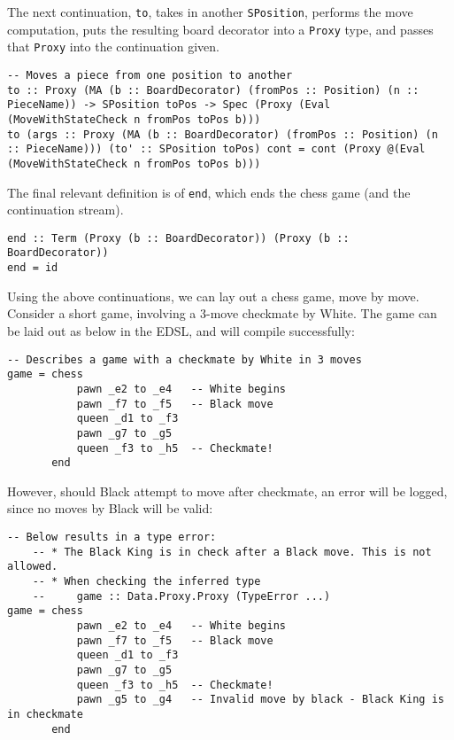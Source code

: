 \documentclass[12pt, a4paper]{scrartcl}
\begin{document}
The next continuation, \lstinline{to}, takes in another \lstinline{SPosition}, performs the move computation, puts the resulting board decorator into a \lstinline{Proxy} type, and passes that \lstinline{Proxy} into the continuation given.

\begin{lstlisting}
-- Moves a piece from one position to another
to :: Proxy (MA (b :: BoardDecorator) (fromPos :: Position) (n :: PieceName)) -> SPosition toPos -> Spec (Proxy (Eval (MoveWithStateCheck n fromPos toPos b)))
to (args :: Proxy (MA (b :: BoardDecorator) (fromPos :: Position) (n :: PieceName))) (to' :: SPosition toPos) cont = cont (Proxy @(Eval (MoveWithStateCheck n fromPos toPos b)))
\end{lstlisting}

The final relevant definition is of \lstinline{end}, which ends the chess game (and the continuation stream).

\begin{lstlisting}
end :: Term (Proxy (b :: BoardDecorator)) (Proxy (b :: BoardDecorator))
end = id
\end{lstlisting}

Using the above continuations, we can lay out a chess game, move by move. Consider a short game, involving a 3-move checkmate by White. The game can be laid out as below in the EDSL, and will compile successfully:

\begin{lstlisting}
-- Describes a game with a checkmate by White in 3 moves
game = chess
           pawn _e2 to _e4   -- White begins
           pawn _f7 to _f5   -- Black move
           queen _d1 to _f3
           pawn _g7 to _g5
           queen _f3 to _h5  -- Checkmate!
       end
\end{lstlisting}

However, should Black attempt to move after checkmate, an error will be logged, since no moves by Black will be valid:

\begin{lstlisting}
-- Below results in a type error:
    -- * The Black King is in check after a Black move. This is not allowed.
    -- * When checking the inferred type
    --     game :: Data.Proxy.Proxy (TypeError ...)
game = chess
           pawn _e2 to _e4   -- White begins
           pawn _f7 to _f5   -- Black move
           queen _d1 to _f3
           pawn _g7 to _g5
           queen _f3 to _h5  -- Checkmate!
           pawn _g5 to _g4   -- Invalid move by black - Black King is in checkmate
       end
\end{lstlisting}
\end{document}
